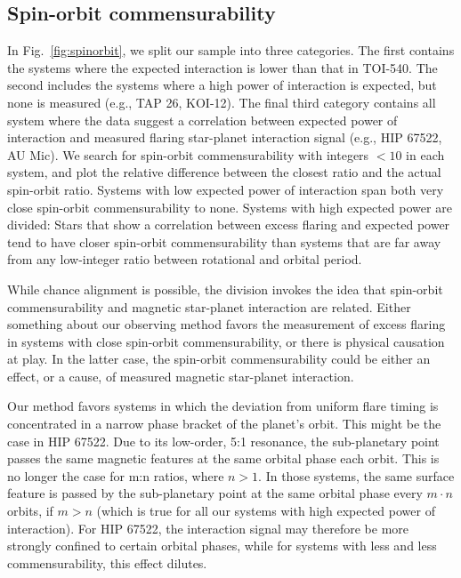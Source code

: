 \documentclass[twocolumn]{aastex631}
\begin{document}
\subsection{Spin-orbit commensurability}
\label{sec:discussion:commensurability}
In Fig.~\ref{fig:spinorbit}, we split our sample into three categories. The first contains the systems where the expected interaction is lower than that in TOI-540. The second includes the systems where a high power of interaction is expected, but none is measured (e.g., TAP 26, KOI-12). The final third category contains all system where the data suggest a correlation between expected power of interaction and measured flaring star-planet interaction signal (e.g., HIP 67522, AU Mic). We search for spin-orbit commensurability with integers $<10$ in each system, and plot the relative difference between the closest ratio and the actual spin-orbit ratio. Systems with low expected power of interaction span both very close spin-orbit commensurability to none. 
Systems with high expected power are divided: Stars that show a correlation between excess flaring and expected power tend to have closer spin-orbit commensurability than systems that are far away from any low-integer ratio between rotational and orbital period.

While chance alignment is possible, the division invokes the idea that spin-orbit commensurability and magnetic star-planet interaction are related. Either something about our observing method favors the measurement of excess flaring in systems with close spin-orbit commensurability, or there is physical causation at play. In the latter case, the spin-orbit commensurability could be either an effect, or a cause, of measured magnetic star-planet interaction.

Our method favors systems in which the deviation from uniform flare timing is concentrated in a narrow phase bracket of the planet's orbit. This might be the case in HIP 67522. Due to its low-order, 5:1 resonance, the sub-planetary point passes the same magnetic features at the same orbital phase each orbit. This is no longer the case for m:n ratios, where $n>1$. In those systems, the same surface feature is passed by the sub-planetary point at the same orbital phase every $m \cdot n$ orbits, if $m>n$ (which is true for all our systems with high expected power of interaction). For HIP 67522, the interaction signal may therefore be more strongly confined to certain orbital phases, while for systems with less and less commensurability, this effect dilutes. 
\end{document}
